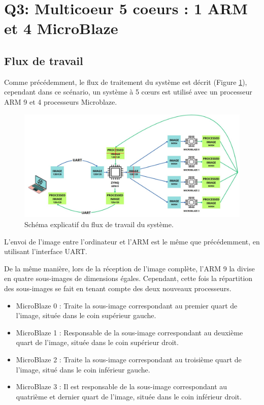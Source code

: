 \documentclass[../CSC_5RO07_TA.tex]{subfiles}
\begin{document}
\section{Q3: Multicoeur 5 coeurs : 1 ARM et 4 MicroBlaze}

\subsection{Flux de travail}

Comme précédemment, le flux de traitement du système est décrit (Figure \ref{fig:8}), cependant dans ce scénario, un système à 5 cœurs est utilisé avec un processeur ARM 9 et 4 processeurs Microblaze.

\begin{figure}[H]
    \centering
    \includegraphics[width=0.8\columnwidth]{./images/DiagramaBloques5x5.jpg}
    \caption{Schéma explicatif du flux de travail du système.}
    \label{fig:8}
\end{figure}

L'envoi de l'image entre l'ordinateur et l'ARM est le même que précédemment, en utilisant l'interface UART.

\vspace{1em} 

De la même manière, lors de la réception de l'image complète, l'ARM 9 la divise en quatre sous-images de dimensions égales. Cependant, cette fois la répartition des sous-images se fait en tenant compte des deux nouveaux processeurs.

\begin{itemize}
    \item MicroBlaze 0 : Traite la sous-image correspondant au premier quart de l'image, située dans le coin supérieur gauche.
    \item MicroBlaze 1 : Responsable de la sous-image correspondant au deuxième quart de l'image, située dans le coin supérieur droit.
    \item MicroBlaze 2 : Traite la sous-image correspondant au troisième quart de l'image, situé dans le coin inférieur gauche.
    \item MicroBlaze 3 : Il est responsable de la sous-image correspondant au quatrième et dernier quart de l'image, située dans le coin inférieur droit.
\end{itemize}
\end{document}
